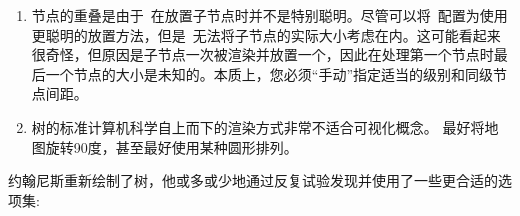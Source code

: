 %
\begin{enumerate}
    \item 节点的重叠是由于\tikzname\ 在放置子节点时并不是特别聪明。尽管可以将\tikzname\ 配置为使用更聪明的放置方法，但是\tikzname\ 无法将子节点的实际大小考虑在内。这可能看起来很奇怪，但原因是子节点一次被渲染并放置一个，因此在处理第一个节点时最后一个节点的大小是未知的。本质上，您必须``手动''指定适当的级别和同级节点间距。
    \item 树的标准计算机科学自上而下的渲染方式非常不适合可视化概念。 最好将地图旋转90度，甚至最好使用某种圆形排列。
\end{enumerate}


约翰尼斯重新绘制了树，他或多或少地通过反复试验发现并使用了一些更合适的选项集:

